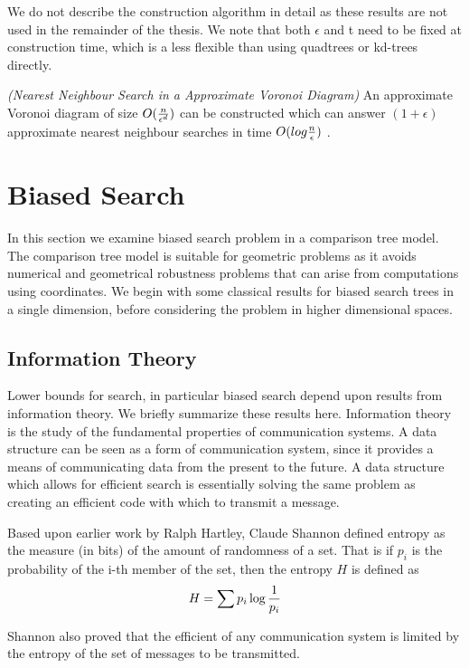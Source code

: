 \documentclass[mcs]{scsthesis}
\begin{document}
We do not describe the construction algorithm in detail as these results are
not used in the remainder of the thesis. We note that both \(\epsilon\) and t
need to be fixed at construction time, which is a less flexible than using
quadtrees or kd-trees directly.

\begin{thm} \emph{(Nearest Neighbour Search in a Approximate Voronoi Diagram)} 
An approximate Voronoi diagram of size \(O({n \over \epsilon ^ d})\) can be
constructed which can answer \((1 + \epsilon)\) approximate nearest neighbour
searches in time \(O(log {n \over \epsilon})\) \cite{arya-avd}.
\end{thm}

\section{Biased Search}

In this section we examine biased search problem in a comparison tree model.
The comparison tree model is suitable for geometric problems as it avoids
numerical and geometrical robustness problems that can arise from computations
using coordinates.  We begin with some classical results for biased search trees
in a single dimension, before considering the problem in higher dimensional spaces.

\subsection{Information Theory}

Lower bounds for search, in particular biased search depend upon results from
information theory. We briefly summarize these results here.  Information theory
is the study of the fundamental properties of communication systems. A data
structure can be seen as a form of communication system, since it provides a
means of communicating data from the present to the future.  A data structure
which allows for efficient search is essentially solving the same problem as
creating an efficient code with which to transmit a message.

Based upon earlier work by Ralph Hartley, Claude Shannon \cite{claudeshannonwasagod}
defined entropy as the measure (in bits) of the amount of randomness of a set.
That is if \(p_i\) is the probability of the i-th member of the set, then the
entropy \(H\) is defined as
$$
H = \sum{ p_i \log{1 \over p_i}}
$$

Shannon also proved that the efficient of any communication system is limited
by the entropy of the set of messages to be transmitted.
\end{document}

